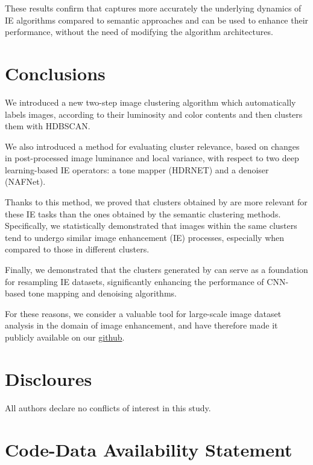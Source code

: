 \documentclass[12pt]{spieman}  %
\begin{document}
\begin{spacing}{2}
\begin{linenumbers}
These results confirm that \clustname captures more accurately the underlying dynamics of IE algorithms compared to semantic approaches and can be used to enhance their performance, without the need of modifying the algorithm architectures. 





\section{Conclusions}
\label{sec:Conclusion}

We introduced a new two-step image clustering algorithm \clustname which automatically labels images, according to their luminosity and color contents and then clusters them with HDBSCAN.

We also introduced a method for evaluating cluster relevance, based on changes in post-processed image luminance and local variance, with respect to two deep learning-based IE operators: a tone mapper (HDRNET) and a denoiser (NAFNet).

Thanks to this method, we proved that clusters obtained by \clustname are more relevant for these IE tasks than the ones obtained by the semantic clustering methods. Specifically, we statistically demonstrated that images within the same \clustname clusters tend to undergo similar image enhancement (IE) processes, especially when compared to those in different clusters.



Finally, we demonstrated that the clusters generated by \clustname can serve as a foundation for resampling IE datasets, significantly enhancing the performance of CNN-based tone mapping and denoising algorithms.


For these reasons, we consider \clustname a valuable tool for large-scale image dataset analysis in the domain of image enhancement, and have therefore made it publicly available on our \href{https://github.com/GiuliaBonino/CARDIE}{github}. 


\section*{Discloures}
\label{app:disc}
 
All authors declare no conflicts of interest in this study.


\section*{Code-Data Availability Statement}
\label{app:code availabiliy}


\end{linenumbers}
\end{spacing}
\end{document}
